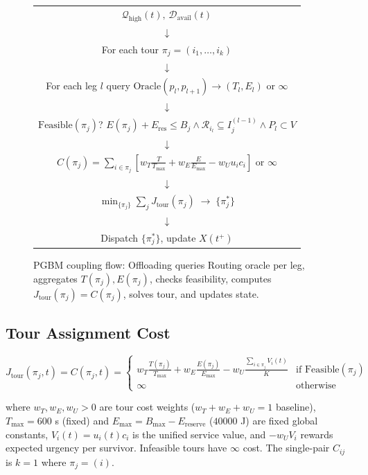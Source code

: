 \documentclass[conference]{IEEEtran}
\begin{document}
\begin{figure}[h]
\centering
\footnotesize
\begin{tabular}{c}
$\mathcal{Q}_{\text{high}}(t),\, \mathcal{D}_{\text{avail}}(t)$ \\[2pt]
$\downarrow$ \\[2pt]
For each tour $\pi_j=(i_1,\dots,i_k)$ \\[2pt]
$\downarrow$ \\[2pt]
For each leg $l$ query $\text{Oracle}(p_l,p_{l+1})\!\to\!(T_l,E_l)$ or $\infty$ \\[2pt]
$\downarrow$ \\[2pt]
$\text{Feasible}(\pi_j)$? \; $E(\pi_j)+E_{\text{res}}\!\leq\!B_j \land \mathcal{R}_{i_l}\!\subseteq\!I_j^{(l-1)} \land P_l\!\subset\!V$ \\[2pt]
$\downarrow$ \\[2pt]
$C(\pi_j)=\sum_{i\in\pi_j}[w_T\frac{T}{T_{\max}}+w_E\frac{E}{E_{\max}}-w_U u_i c_i]$ or $\infty$ \\[2pt]
$\downarrow$ \\[2pt]
$\displaystyle\min_{\{\pi_j\}}\sum_j J_{\text{tour}}(\pi_j)\;\to\;\{\pi_j^*\}$ \\[2pt]
$\downarrow$ \\[2pt]
Dispatch $\{\pi_j^*\}$, update $X(t^+)$ \\[2pt]
\end{tabular}
\caption{PGBM coupling flow: Offloading queries Routing oracle per leg, aggregates $T(\pi_j),E(\pi_j)$, checks feasibility, computes $J_{\text{tour}}(\pi_j)=C(\pi_j)$, solves tour, and updates state.}
\label{fig:coupling}
\end{figure}

\subsection{Tour Assignment Cost}

\begin{equation}
J_{\text{tour}}(\pi_j,t)=C(\pi_j,t)= \begin{cases}
w_T\frac{T(\pi_j)}{T_{\max}}+w_E\frac{E(\pi_j)}{E_{\max}}-w_U\frac{\sum_{i\in\pi_j}V_i(t)}{K} & \text{if Feasible}(\pi_j) \\
\infty & \text{otherwise}
\end{cases}
\label{eq:cost}
\end{equation}

where $w_T, w_E, w_U > 0$ are tour cost weights ($w_T+w_E+w_U=1$ baseline), $T_{\max}=600$ s (fixed) and $E_{\max}=B_{\max}-E_{\text{reserve}}$ ($40000$ J) are fixed global constants, $V_i(t)=u_i(t)c_i$ is the unified service value, and $-w_U V_i$ rewards expected urgency per survivor. Infeasible tours have $\infty$ cost. The single-pair $C_{ij}$ is $k=1$ where $\pi_j=(i)$.
\end{document}
